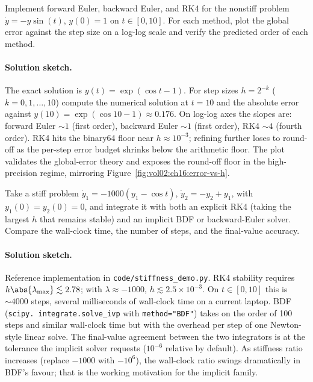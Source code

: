 \begin{exercise}
Implement forward Euler, backward Euler, and RK4 for the
nonstiff problem $\dot{y} = -y \sin(t)$, $y(0) = 1$ on $t \in
[0, 10]$. For each method, plot the global error against the
step size on a log-log scale and verify the predicted order of
each method.
\end{exercise}

\paragraph{Solution sketch.}
The exact solution is $y(t) = \exp(\cos t - 1)$. For step sizes
$h = 2^{-k}$ ($k = 0, 1, \ldots, 10$) compute the numerical
solution at $t = 10$ and the absolute error against $y(10)
= \exp(\cos 10 - 1) \approx 0.176$. On log-log axes the slopes
are: forward Euler $\sim 1$ (first order), backward Euler $\sim 1$
(first order), RK4 $\sim 4$ (fourth order). RK4 hits the binary64
floor near $h \approx 10^{-3}$; refining further loses to
round-off as the per-step error budget shrinks below the
arithmetic floor. The plot validates the global-error theory and
exposes the round-off floor in the high-precision regime, mirroring
Figure~\ref{fig:vol02:ch16:error-vs-h}.

\begin{exercise}
Take a stiff problem $\dot{y}_{1} = -1000(y_{1} - \cos t)$,
$\dot{y}_{2} = -y_{2} + y_{1}$, with $y_{1}(0) = y_{2}(0) = 0$,
and integrate it with both an explicit RK4 (taking the largest
$h$ that remains stable) and an implicit BDF or backward-Euler
solver. Compare the wall-clock time, the number of steps, and the
final-value accuracy.
\end{exercise}

\paragraph{Solution sketch.}
Reference implementation in \texttt{code/stiffness\_demo.py}.
RK4 stability requires $h \abs{\lambda_{\max}} \lesssim 2.78$;
with $\lambda \approx -1000$, $h \lesssim 2.5 \times 10^{-3}$.
On $t \in [0, 10]$ this is $\sim 4000$ steps, several milliseconds
of wall-clock time on a current laptop. BDF (\texttt{scipy.
integrate.solve\_ivp} with \texttt{method="BDF"}) takes on the
order of 100 steps and similar wall-clock time but with the
overhead per step of one Newton-style linear solve. The
final-value agreement between the two integrators is at the
tolerance the implicit solver requests ($10^{-6}$ relative by
default). As stiffness ratio increases (replace $-1000$ with
$-10^{6}$), the wall-clock ratio swings dramatically in BDF's
favour; that is the working motivation for the implicit family.

